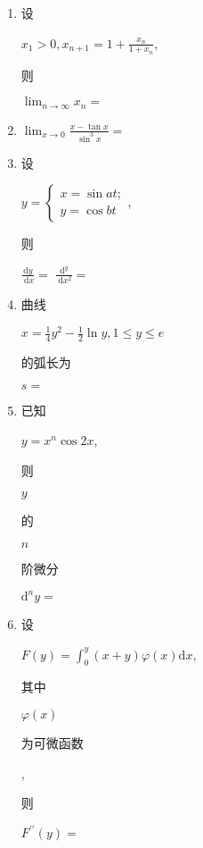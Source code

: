 \documentclass[10pt]{article}
\begin{document}
\begin{enumerate}
  \item \begin{CJK}{UTF8}{mj}设\end{CJK} $x_{1}>0, x_{n+1}=1+\frac{x_{n}}{1+x_{n}}$, \begin{CJK}{UTF8}{mj}则\end{CJK} $\lim _{n \rightarrow \infty} x_{n}=$

  \item $\lim _{x \rightarrow 0} \frac{x-\tan x}{\sin ^{3} x}=$

  \item \begin{CJK}{UTF8}{mj}设\end{CJK} $y=\left\{\begin{array}{l}x=\sin a t ; \\ y=\cos b t\end{array}\right.$, \begin{CJK}{UTF8}{mj}则\end{CJK} $\frac{\mathrm{d} y}{\mathrm{~d} x}=$ $\frac{\mathrm{d}^{y}}{\mathrm{~d} x^{2}}=$

  \item \begin{CJK}{UTF8}{mj}曲线\end{CJK} $x=\frac{1}{4} y^{2}-\frac{1}{2} \ln y, 1 \leqslant y \leqslant e$ \begin{CJK}{UTF8}{mj}的弧长为\end{CJK} $s=$

  \item \begin{CJK}{UTF8}{mj}已知\end{CJK} $y=x^{n} \cos 2 x$, \begin{CJK}{UTF8}{mj}则\end{CJK} $y$ \begin{CJK}{UTF8}{mj}的\end{CJK} $n$ \begin{CJK}{UTF8}{mj}阶微分\end{CJK} $\mathrm{d}^{n} y=$

  \item \begin{CJK}{UTF8}{mj}设\end{CJK} $F(y)=\int_{0}^{y}(x+y) \varphi(x) \mathrm{d} x$, \begin{CJK}{UTF8}{mj}其中\end{CJK} $\varphi(x)$ \begin{CJK}{UTF8}{mj}为可微函数\end{CJK}, \begin{CJK}{UTF8}{mj}则\end{CJK} $F^{\prime \prime}(y)=$


\end{enumerate}
\end{document}
